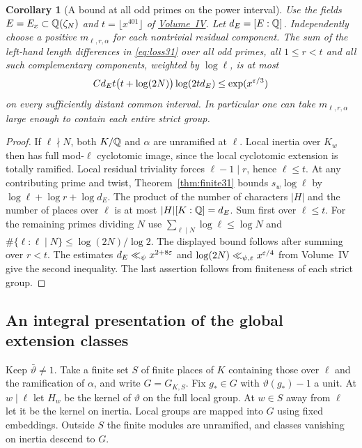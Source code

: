 \documentclass[a4paper,11pt]{article}
\newtheorem{corollary}[proposition]{Corollary}
\theoremstyle{definition}
\theoremstyle{remark}
\numberwithin{equation}{section}
\begin{document}
\begin{corollary}[A bound at all odd primes on the power interval]\label{cor:sum31}
Use the fields \(E=E_x\subset\mathbb Q(\zeta_N)\) and \(t=\lfloor x^{401}\rfloor\) of \hyperref[nav:volume-IV]{Volume~IV}. Let \(d_E=[E:\mathbb Q]\). Independently choose a positive \(m_{\ell,r,\alpha}\) for each nontrivial residual component. The sum of the left-hand length differences in \eqref{eq:loss31} over all odd primes, all \(1\le r<t\) and all such complementary components, weighted by \(\log\ell\), is at most
\begin{equation}
 C d_E t\bigl(t+\log(2N)\bigr)\log(2td_E)
                  \le \exp(x^{\varepsilon/3})                         \label{eq:family31}
\end{equation}
on every sufficiently distant common interval. In particular one can take \(m_{\ell,r,\alpha}\) large enough to contain each entire strict group.
\end{corollary}
\begin{proof}
If \(\ell\nmid N\), both \(K/\mathbb Q\) and \(\alpha\) are unramified at \(\ell\). Local inertia over \(K_w\) then has full mod-\(\ell\) cyclotomic image, since the local cyclotomic extension is totally ramified. Local residual triviality forces \(\ell-1\mid r\), hence \(\ell\le t\). At any contributing prime and twist, Theorem~\ref{thm:finite31} bounds \(s_w\log\ell\) by \(\log\ell+\log r+\log d_E\). The product of the number of characters \(|H|\) and the number of places over \(\ell\) is at most \(|H|[K:\mathbb Q]=d_E\). Sum first over \(\ell\le t\). For the remaining primes dividing \(N\) use \(\sum_{\ell\mid N}\log\ell\le\log N\) and \(\#\{\ell:\ell\mid N\}\le\log(2N)/\log2\). The displayed bound follows after summing over \(r<t\). The estimates \(d_E\ll_\psi x^{2+8\varepsilon}\) and \(\log(2N)\ll_{\psi,\varepsilon}x^{\varepsilon/4}\) from Volume~IV give the second inequality. The last assertion follows from finiteness of each strict group.
\end{proof}

\subsection{An integral presentation of the global extension classes}\label{nav:IV-01}
\label{sec:present31}

Keep \(\bar\vartheta\ne1\). Take a finite set \(S\) of finite places of \(K\) containing those over \(\ell\) and the ramification of \(\alpha\), and write \(G=G_{K,S}\). Fix \(g_*\in G\) with \(\vartheta(g_*)-1\) a unit. At \(w\mid\ell\) let \(H_w\) be the kernel of \(\vartheta\) on the full local group. At \(w\in S\) away from \(\ell\) let it be the kernel on inertia. Local groups are mapped into \(G\) using fixed embeddings. Outside \(S\) the finite modules are unramified, and classes vanishing on inertia descend to \(G\).
\end{document}
